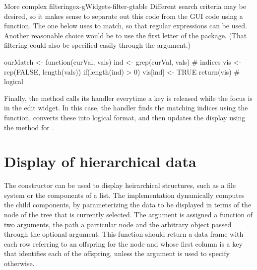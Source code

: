 \begin{example}{More complex filtering}{ex-gWidgets-filter-gtable}
Different search criteria may be desired, so it makes sense to
separate out this code from the GUI code using a function. The one below
uses  to match, so that regular expressions can be
used. Another reasonable choice would be to use the first letter of
the package. (That filtering could also be specified easily through the
 argument.)

\begin{Schunk}
\begin{Sinput}
 ourMatch <- function(curVal, vals) {
   ind <- grep(curVal, vals)             # indices
   vis <- rep(FALSE, length(vals))
   if(length(ind) > 0)
     vis[ind] <- TRUE
   return(vis)                           # logical
 }
\end{Sinput}
\end{Schunk}

Finally, the  method calls its handler
everytime a key is released while the focus is in the edit widget. In
this case, the handler finds the matching indices using the
 function, converts these into logical format, and then
updates the display using the  method for
  .
\begin{Schunk}
\end{Schunk}
\end{example}


\section{Display of hierarchical data}
\label{sec:gWidgets-displ-heir-data}

The  constructor can be used to display
heirarchical structures, such as a file system or the components of a
list. The  implementation dynamically computes the
child components, by parameterizing the data to be displayed in terms
of the node of the tree that is currently selected. The
 argument is assigned a function of two
arguments, the path a particular node and the arbitrary object passed
through the optional  argument. This
function should return a data frame with each row referring to an
offspring for the node and whose first column is a key that identifies
each of the offspring, unless the argument 
is used to specify otherwise.

